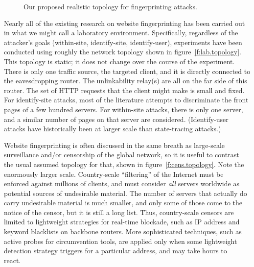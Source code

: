 \begin{figure*}[t!]
%
\caption{Our proposed realistic topology for fingerprinting attacks.}%
\label{f:real.topology}%
\end{figure*}

Nearly all of the existing research on website fingerprinting has been
carried out in what we might call a laboratory environment.
Specifically, regardless of the attacker's goals (within-site,
identify-site, identify-user), experiments have been conducted using
roughly the network topology shown in figure~\ref{f:lab.topology}.
This topology is static; it does not change over the course of the
experiment.  There is only one traffic source, the targeted client,
and it is directly connected to the eavesdropping router.  The
unlinkability relay(s) are all on the far side of this router.  The
set of HTTP requests that the client might make is small and fixed.
For identify-site attacks, most of the literature attempts to
discriminate the front pages of a few hundred servers.  For
within-site attacks, there is only one server, and a similar number of
pages on that server are considered.  (Identify-user attacks have
historically been at larger scale than state-tracing attacks.)

Website fingerprinting is often discussed in the same breath as
large-scale surveillance and/or censorship of the global network, so
it is useful to contrast the usual assumed topology for that, shown in
figure~\ref{f:cens.topology}.  Note the enormously larger scale.
Country-scale “filtering” of the Internet must be enforced against
millions of clients, and must consider \emph{all} servers worldwide as
potential sources of undesirable material.  The number of servers that
actually do carry undesirable material is much smaller, and only some
of those come to the notice of the censor, but it is still a long
list.  Thus, country-scale censors are limited to lightweight
strategies for real-time blockade, such as IP address and keyword
blacklists on backbone routers.  More sophisticated techniques, such
as active probes for circumvention tools, are applied only when some
lightweight detection strategy triggers for a particular address, and
may take hours to react.~\cite{aase2012whiskey}~

